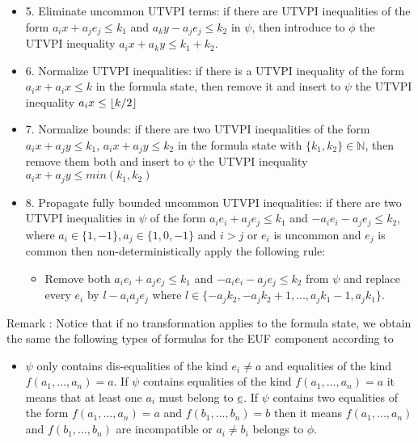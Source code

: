 \begin{itemize}
  \item[] 5. Eliminate uncommon UTVPI terms: 
    if there are UTVPI inequalities of the form $a_i x + a_j e_j \leq k_1$
    and $a_k y - a_j e_j \leq k_2$ in $\psi$, then introduce to $\phi$ the 
    UTVPI inequality $a_i x + a_k y \leq k_1 + k_2$.

  \item[] 6. Normalize UTVPI inequalities:
    if there is a UTVPI inequality of the form $a_i x + a_i x \leq k$ in 
    the formula state, then remove it and insert to $\psi$ the UTVPI
    inequality $a_i x \leq \lfloor k/2 \rfloor$

  \item[] 7.  Normalize bounds:
    if there are two UTVPI inequalities of the form $a_i x + a_j y \leq k_1$,
    $a_i x + a_j y \leq k_2$ in 
    the formula state with $\{k_1, k_2\} \in \mathbb{N}$, 
    then remove them both and insert to $\psi$ the UTVPI
    inequality $a_i x + a_j y \leq min(k_1, k_2)$

  \item[] 8.  Propagate fully bounded uncommon UTVPI inequalities: 
    if there are two UTVPI inequalities 
    in $\psi$ of the form $a_i e_i + a_j e_j \leq k_1$ and 
    $-a_i e_i - a_j e_j \leq k_2$, 
    where $a_i \in \{1, -1\}, a_j \in \{1, 0, -1\}$ and $i > j$ or $e_i$ is uncommon
    and $e_j$ is common
    then  non-deterministically apply the following rule:
    \begin{itemize}
      \item Remove both $a_i e_i + a_j e_j \leq k_1$ and $-a_i e_i - a_j e_j \leq k_2$
        from $\psi$ and replace every $e_i$ by $l - a_i a_j e_j$ where $
        l \in \{- a_j k_2, -a_j k_2 + 1, \dots, a_j k_1 - 1, a_j k_1\}$.
    \end{itemize}

  \end{itemize} 

Remark \label{my_remark}: Notice that if no 
transformation applies 
to the formula state, we obtain the same 
the following types of formulas for the EUF 
component according to \cite{ghilardi2020compactly} 

\begin{itemize}
  \item $\psi$ only contains dis-equalities of the kind $e_i \neq a$ and equalities of
    the kind $f(a_1, \dots, a_n) = a$. If $\psi$ contains equalities of the
    kind $f(a_1, \dots, a_n) = a$ it means that at least one $a_i$ must belong
    to $\underline{e}$. If $\psi$ contains two equalities of the form
    $f(a_1, \dots, a_n) = a$ and $f(b_1, \dots, b_n) = b$ then it means
    $f(a_1, \dots, a_n)$ and $f(b_1, \dots, b_n)$ are incompatible or $a_i \neq b_i$
    belongs to $\phi$.
\end{itemize}

